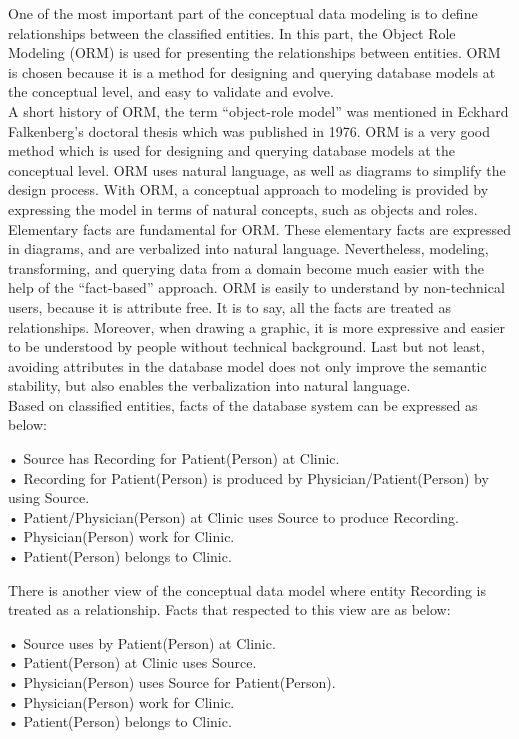 One of the most important part of the conceptual data modeling is to define relationships between the classified entities. In this part, the Object Role Modeling (ORM) is used for presenting the relationships between entities. ORM is chosen because it is a method for designing and querying database models at the conceptual level, and easy to validate and evolve\cite{ORMdotNET}.\\
A short history of ORM, the term “object-role model” was mentioned in Eckhard Falkenberg’s doctoral thesis which was published in 1976\cite{Wiki_ORM}. ORM is a very good method which is used for designing and querying database models at the conceptual level. ORM uses natural language, as well as diagrams to simplify the design process. With ORM, a conceptual approach to modeling is provided by expressing the model in terms of natural concepts, such as objects and roles. Elementary facts are fundamental for ORM. These elementary facts are expressed in diagrams, and are verbalized into natural language. Nevertheless, modeling, transforming, and querying data from a domain become much easier with the help of the “fact-based” approach. ORM is easily to understand by non-technical users, because it is attribute free. It is to say, all the facts are treated as relationships. Moreover, when drawing a graphic, it is more expressive and easier to be understood by people without technical background. Last but not least, avoiding attributes in the database model does not only improve the semantic stability, but also enables the verbalization into natural language.\\
Based on classified entities, facts of the database system can be expressed as below:
\begin{adjustwidth}{1cm}{}
•	Source has Recording for Patient(Person) at Clinic.\\
•	Recording for Patient(Person) is produced by Physician/Patient(Person) by using Source.\\
•	Patient/Physician(Person) at Clinic uses Source to produce Recording.\\
•	Physician(Person) work for Clinic.\\
•	Patient(Person) belongs to Clinic.
\end{adjustwidth}
There is another view of the conceptual data model where entity Recording is treated as a relationship. Facts that respected to this view are as below:
\begin{adjustwidth}{1cm}{}
•	Source uses by Patient(Person) at Clinic.\\
•	Patient(Person) at Clinic uses Source.\\
•	Physician(Person) uses Source for Patient(Person).\\
•	Physician(Person) work for Clinic.\\
•	Patient(Person) belongs to Clinic.
\end{adjustwidth}
